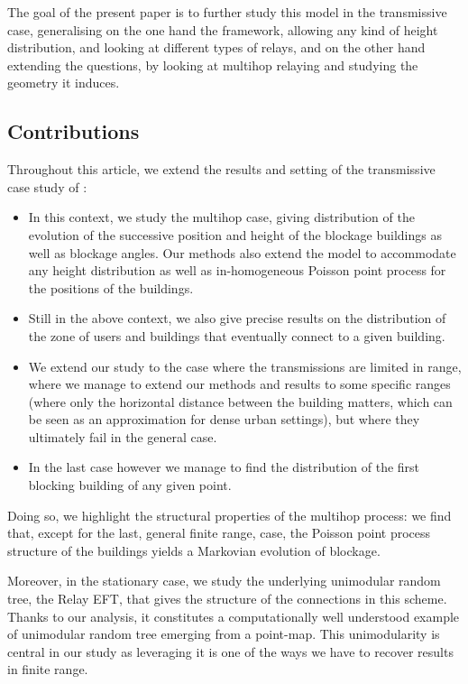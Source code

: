 \documentclass[10pt,english,a4paper]{smfart}
\theoremstyle{definition}
\theoremstyle{remark}
\begin{document}
The goal of the present paper is to further study this model in the transmissive case, generalising on the one hand the framework, allowing any kind of height distribution, and looking at different types of relays, and on the other hand extending the questions, by looking at multihop relaying and studying the geometry it induces.

\subsection*{Contributions}

Throughout this article, we extend the results and setting of the transmissive case study of \cite{Junse_Francois}:
\begin{itemize}
    \item In this context, we study the multihop case, giving distribution of the evolution of the successive position and height of the blockage buildings as well as blockage angles. Our methods also extend the model to accommodate any height distribution as well as in-homogeneous Poisson point process for the positions of the buildings.
    \item Still in the above context, we also give precise results on the distribution of the zone of users and buildings that eventually connect to a given building.
    \item We extend our study to the case where the transmissions are limited in range, where we manage to extend our methods and results to some specific ranges (where only the horizontal distance between the building matters, which can be seen as an approximation for dense urban settings), but where they ultimately fail in the general case.
    \item In the last case however we manage to find the distribution of the first blocking building of any given point.
\end{itemize}

Doing so, we highlight the structural properties of the multihop process: we find that, except for the last, general finite range, case, the Poisson point process structure of the buildings yields a Markovian evolution of blockage.

Moreover, in the stationary case, we study the underlying unimodular random tree, the Relay EFT, that gives the structure of the connections in this scheme. Thanks to our analysis, it constitutes a computationally well understood example of unimodular random tree emerging from a point-map. This unimodularity is central in our study as leveraging it is one of the ways we have to recover results in finite range.
\end{document}
